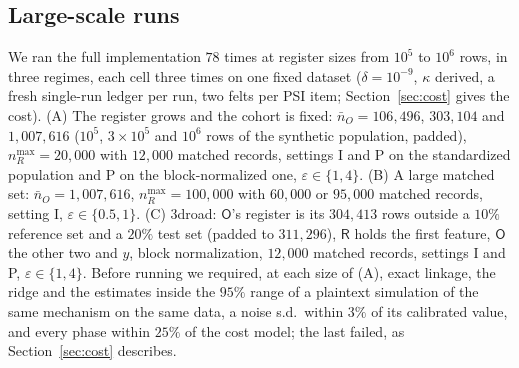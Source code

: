 \documentclass[11pt]{article}
\theoremstyle{definition}
\theoremstyle{plain}
\newcommand{\Party}[1]{\textsf{#1}}
\newcommand{\Rp}{\Party{R}}
\newcommand{\Op}{\Party{O}}
\begin{document}
\subsection{Large-scale runs}
\label{sec:eval:large}

We ran the full implementation $78$ times at register sizes from $10^5$ to $10^6$ rows, in three regimes, each cell three times on one fixed dataset ($\delta = 10^{-9}$, $\kappa$ derived, a fresh single-run ledger per run, two felts per PSI item; Section~\ref{sec:cost} gives the cost). (A) The register grows and the cohort is fixed: $\bar n_O = 106{,}496$, $303{,}104$ and $1{,}007{,}616$ ($10^5$, $3 \times 10^5$ and $10^6$ rows of the synthetic population, padded), $n_R^{\max} = 20{,}000$ with $12{,}000$ matched records, settings I and P on the standardized population and P on the block-normalized one, $\varepsilon \in \{1, 4\}$. (B) A large matched set: $\bar n_O = 1{,}007{,}616$, $n_R^{\max} = 100{,}000$ with $60{,}000$ or $95{,}000$ matched records, setting I, $\varepsilon \in \{0.5, 1\}$. (C) 3droad: $\Op$'s register is its $304{,}413$ rows outside a $10\%$ reference set and a $20\%$ test set (padded to $311{,}296$), $\Rp$ holds the first feature, $\Op$ the other two and $y$, block normalization, $12{,}000$ matched records, settings I and P, $\varepsilon \in \{1, 4\}$. Before running we required, at each size of (A), exact linkage, the ridge and the estimates inside the $95\%$ range of a plaintext simulation of the same mechanism on the same data, a noise s.d.\ within $3\%$ of its calibrated value, and every phase within $25\%$ of the cost model; the last failed, as Section~\ref{sec:cost} describes.
\end{document}
